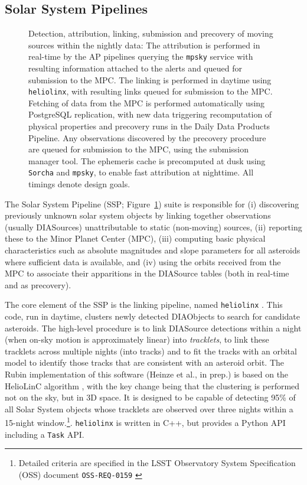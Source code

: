 \subsection{Solar System Pipelines}
\label{sec:solsys}

\begin{figure}
\begin{center}

\caption{\label{fig:ssp} Detection, attribution, linking, submission and precovery of moving sources within the nightly data: The attribution is performed in real-time by the AP pipelines querying the \texttt{mpsky} service with resulting information attached to the alerts and queued for submission to the MPC.
The linking is performed in daytime using \texttt{heliolinx}, with resulting links queued for submission to the MPC.
Fetching of data from the MPC is performed automatically using PostgreSQL replication, with new data triggering recomputation of physical properties and precovery runs in the Daily Data Products Pipeline.
Any observations discovered by the precovery procedure are queued for submission to the MPC, using the submission manager tool.
The ephemeris cache is precomputed at dusk using \texttt{Sorcha} and \texttt{mpsky}, to enable fast attribution at nighttime.
All timings denote design goals.
}

\end{center}
\end{figure}
The Solar System Pipeline (SSP; Figure~\ref{fig:ssp}) suite is responsible for (i) discovering previously unknown solar system objects by linking together observations (usually DIASources) unattributable to static (non-moving) sources, (ii) reporting these to the Minor Planet Center (MPC), (iii) computing basic physical characteristics such as absolute magnitudes and slope parameters for all asteroids where sufficient data is available, and (iv) using the orbits received from the MPC to associate their apparitions in the DIASource tables (both in real-time and as precovery).

The core element of the SSP is the linking pipeline, named \texttt{heliolinx} \citep{heliolinx}.
This code, run in daytime, clusters newly detected DIAObjects to search for candidate asteroids.
The high-level procedure is to link DIASource detections within a night (when on-sky motion is approximately linear) into {\em tracklets}, to link these tracklets across multiple nights (into tracks) and to fit the tracks with an orbital model to identify those tracks that are consistent with an asteroid orbit.
The Rubin implementation of this software (Heinze et al., in prep.) is based on the HelioLinC algorithm \citep{2018AJ....156..135H}, with the key change being that the clustering is performed not on the sky, but in 3D space.
It is designed to be capable of detecting 95\% of all Solar System objects whose tracklets are observed over three nights within a 15-night window.\footnote{Detailed criteria are specified in the LSST Observatory System Specification (OSS) document \texttt{OSS-REQ-0159} \citep{LSE-30}}.
\texttt{heliolinx} is written in C++, but provides a Python API including a \texttt{Task} API.

